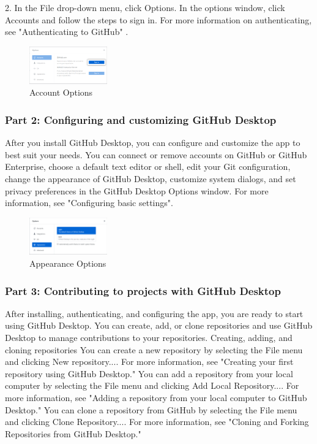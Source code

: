 2.	In the File drop-down menu, click Options. In the options window, click Accounts and follow the steps to sign in. For more information on authenticating, see "Authenticating to GitHub" .

\begin{figure}[ht]
    \centering
    \includegraphics[width=0.3\textwidth]{figures/Account Options.png}
    \caption{Account Options}
\end{figure}


\subsubsection{Part 2: Configuring and customizing GitHub Desktop}
After you install GitHub Desktop, you can configure and customize the app to best suit your needs.
You can connect or remove accounts on GitHub or GitHub Enterprise, choose a default text editor or shell, edit your Git configuration, change the appearance of GitHub Desktop, customize system dialogs, and set privacy preferences in the GitHub Desktop Options window. For more information, see "Configuring basic settings".

\begin{figure}[ht]
    \centering
    \includegraphics[width=0.3\textwidth]{figures/Appearance Options.png}
    \caption{Appearance Options}
\end{figure}


\subsubsection{Part 3: Contributing to projects with GitHub Desktop}

After installing, authenticating, and configuring the app, you are ready to start using GitHub Desktop. You can create, add, or clone repositories and use GitHub Desktop to manage contributions to your repositories.
Creating, adding, and cloning repositories
You can create a new repository by selecting the File menu and clicking New repository.... For more information, see "Creating your first repository using GitHub Desktop."
You can add a repository from your local computer by selecting the File menu and clicking Add Local Repository.... For more information, see "Adding a repository from your local computer to GitHub Desktop."
You can clone a repository from GitHub by selecting the File menu and clicking Clone Repository.... For more information, see "Cloning and Forking Repositories from GitHub Desktop."

